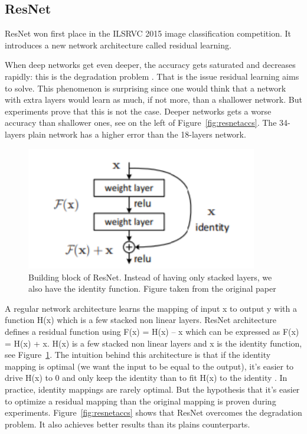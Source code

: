 \subsection{ResNet}
ResNet won first place in the ILSRVC 2015 image classification competition. It introduces a new network architecture called residual learning. 

When deep networks get even deeper, the accuracy gets saturated and decreases rapidly: this is the degradation problem \cite{resnetpaper}. That is the issue residual learning aims to solve. This phenomenon is surprising since one would think that a network with extra layers would learn as much, if not more, than a shallower network. But experiments prove that this is not the case. Deeper networks gets a worse accuracy than shallower ones, see on the left of Figure~\ref{fig:resnetaccs}. The 34-layers plain network has a higher error than the 18-layers network. 

\begin{figure}[!htp]
    \centering
        \includegraphics[width=0.9\textwidth]{figures/02-resnet_block}
        \caption[Building block of Resnet]{Building block of ResNet. Instead of having only stacked layers, we also have the identity function. Figure taken from the original paper \cite{resnetpaper}}\label{fig:resnetblock}
\end{figure}
A regular network architecture learns the mapping of input x to output y with a function H(x) which is a few stacked non linear layers. ResNet architecture defines a residual function using F(x) = H(x) – x which can be expressed as F(x) = H(x) + x. H(x) is a few stacked non linear layers and x is the identity function, see Figure~\ref{fig:resnetblock}. The intuition behind this architecture is that if the identity mapping is optimal (we want the input to be equal to the output), it’s easier to drive H(x) to 0 and only keep the identity than to fit H(x) to the identity \cite{mediumresnet}. In practice, identity mappings are rarely optimal. But the hypothesis that it’s easier to optimize a residual mapping  than the original mapping is proven during experiments. Figure~\ref{fig:resnetaccs} shows that ResNet overcomes the degradation problem. It also achieves better results than its plains counterparts.


